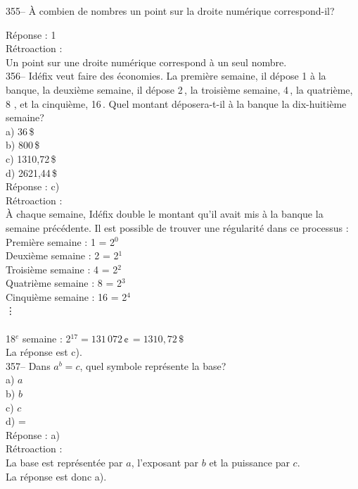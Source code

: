 ﻿\documentclass[letterpaper, 12pt]{article}
\begin{document}
355-- \`A combien de nombres un point sur la droite num\'erique
correspond-il?

R\'eponse : 1\\

R\'etroaction : \\
Un point sur une droite num\'erique correspond \`a un seul nombre.\\

356-- Id\'efix veut faire des \'economies.  La premi\`ere semaine, il
d\'epose 1\,\cent\,\`a la banque,  la deuxi\`eme semaine, il d\'epose
2\,\cent, la troisi\`eme semaine, 4\,\cent, la quatri\`eme, 8\,\cent\,, et
la cinqui\`eme, 16\,\cent.  Quel montant d\'eposera-t-il \`a la banque la
dix-huiti\`eme semaine?\\
a) 36\,\$\\
b) 800\,\$\\
c) 1310,72\,\$\\
d) 2621,44\,\$\\

R\'eponse : c) \\

R\'etroaction : \\
\`A chaque semaine, Id\'efix double le montant qu'il avait mis \`a la banque
la semaine pr\'ec\'edente.  Il est possible de trouver une r\'egularit\'e
dans ce processus :\\
Premi\`ere semaine : 1\,\cent\,= 2$^{0}$\\
Deuxi\`eme semaine : 2\,\cent\,= 2$^{1}$\\
Troisi\`eme semaine : 4\,\cent\,= 2$^{2}$\\
Quatri\`eme semaine : 8\,\cent\,= 2$^{3}$\\
Cinqui\`eme semaine : 16\,\cent\,= 2$^{4}$\\
\vdots\\\\
18$^e$ semaine : 2$^{17}=131\,072\,\cent\,=1310,72\,\$$\\
La r\'eponse est c).\\

357-- Dans $a^{b}=c$, quel symbole repr\'esente  la base?\\
a) $a$\\
b) $b$\\
c) $c$\\
d) =\\

R\'eponse : a)\\

R\'etroaction : \\
La base est repr\'esent\'ee par $a$, l'exposant par $b$ et la
puissance par $c$.\\
La r\'eponse est donc a).\\
\end{document}
